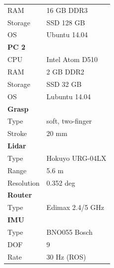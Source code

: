 \begin{figure}[htbp]
\begin{minipage}{0.45\textwidth}
\begin{tabular}{ | p{2cm} | p{3cm} | }
			RAM & 16 GB DDR3 \\
			Storage & SSD 128 GB \\
			OS & Ubuntu 14.04 \\
			\hline \hline
			\bfseries{PC 2} &  \\
			\hline
			CPU & Intel Atom D510 \\
			RAM & 2 GB DDR2 \\
			Storage & SSD 32 GB \\
			OS & Lubuntu 14.04 \\
			\hline \hline
			\bfseries{Grasp} &  \\
			\hline
			Type & soft, two-finger \\
			Stroke & 20 mm \\
			\hline \hline
			\bfseries{Lidar} &  \\
			\hline
			Type & Hokuyo URG-04LX \\
			Range & 5.6 m \\
			Resolution & 0.352 deg \\
			\hline \hline
			\bfseries{Router} &  \\
			\hline
			Type & Edimax 2.4/5 GHz \\
			\hline \hline
			\bfseries{IMU} &  \\
			\hline
			Type & BNO055 Bosch \\
			DOF & 9 \\
			Rate & 30 Hz (ROS) \\
			\hline
		\end{tabular}
		\label{tab:hw}
	\end{minipage}
\end{figure}

\setcounter{figure}{1}

